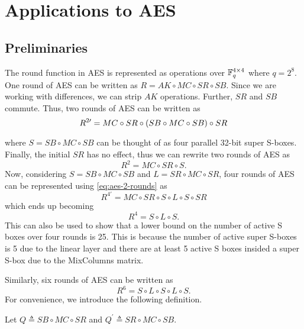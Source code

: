 \documentclass[twoside]{article}
\begin{document}
\section{Applications to AES}

\subsection{Preliminaries}

The round function in AES is represented as operations over \(\mathbb F_q^{4 \times
4}\) where \(q = 2^8\). One round of AES can be written as \(R = AK \circ MC
\circ SR \circ SB\). Since we are working with differences, we can strip \(AK\)
operations. Further, \(SR\) and \(SB\) commute. Thus, two rounds of AES can be
written as
\begin{equation}
    R^{2\prime} = MC \circ SR \circ (SB \circ MC \circ SB) \circ SR
    \label{eq:aes-2-rounds}
\end{equation}

where \(S = SB \circ MC \circ SB\) can be thought of as four parallel 32-bit
super S-boxes. Finally, the initial \(SR\) has no effect, thus we can rewrite
two rounds of AES as
\begin{equation}
    R^2 = MC \circ SR \circ S.
\end{equation}
Now, considering \(S = SB \circ MC \circ SB\) and \(L = SR \circ MC \circ SR\),
four rounds of AES can be represented using \eqref{eq:aes-2-rounds} as
\begin{equation}
    R^{4\prime} = MC \circ SR \circ S \circ L \circ S \circ SR
\end{equation}
which ends up becoming
\begin{equation}
    R^4 = S \circ L \circ S.
\end{equation}
This can also be used to show that a lower bound on the number of active S boxes
over four rounds is 25. This is because the number of active super S-boxes is 5
due to the linear layer and there are at least 5 active S boxes insided a super
S-box due to the MixColumns matrix.

Similarly, six rounds of AES can be written as
\begin{equation}
    R^6 = S \circ L \circ S \circ L \circ S.
\end{equation}
For convenience, we introduce the following definition.

\begin{definition}
    \label{def:q}
    Let \(Q \triangleq SB \circ MC \circ SR\) and \(Q^\prime \triangleq SR \circ
    MC \circ SB\).
\end{definition}
\end{document}
